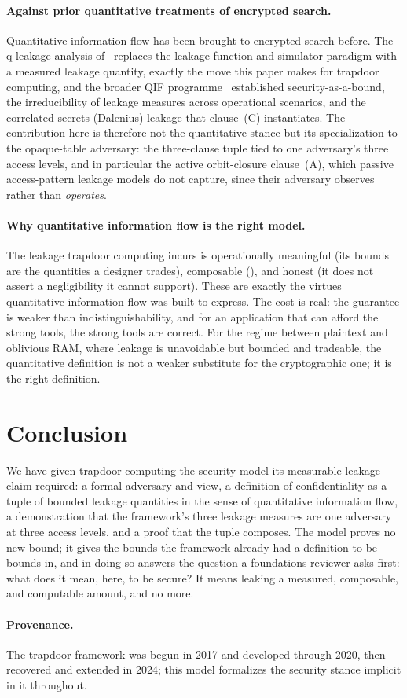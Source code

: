\documentclass[11pt]{article}
\theoremstyle{definition}
\theoremstyle{plain}
\theoremstyle{remark}
\begin{document}
\paragraph{Against prior quantitative treatments of encrypted search.}
Quantitative information flow has been brought to encrypted search before. The
q-leakage analysis of~\cite{falzon2024understanding} replaces the
leakage-function-and-simulator paradigm with a measured leakage quantity, exactly
the move this paper makes for trapdoor computing, and the broader QIF programme~%
\cite{smith2009foundations,alvim2020science,alvim2012gleakage} established
security-as-a-bound, the irreducibility of leakage measures across operational
scenarios, and the correlated-secrets (Dalenius) leakage that clause~(C)
instantiates. The contribution here is therefore not the quantitative stance but
its specialization to the opaque-table adversary: the three-clause tuple tied to
one adversary's three access levels, and in particular the active orbit-closure
clause~(A), which passive access-pattern leakage models do not capture, since
their adversary observes rather than \emph{operates}.

\paragraph{Why quantitative information flow is the right model.}
The leakage trapdoor computing incurs is operationally meaningful (its bounds
are the quantities a designer trades), composable (), and
honest (it does not assert a negligibility it cannot support). These are exactly
the virtues quantitative information flow was built to express. The cost is real:
the guarantee is weaker than indistinguishability, and for an application that
can afford the strong tools, the strong tools are correct. For the regime
between plaintext and oblivious RAM, where leakage is unavoidable but bounded
and tradeable, the quantitative definition is not a weaker substitute for the
cryptographic one; it is the right definition.

\section{Conclusion}

We have given trapdoor computing the security model its measurable-leakage claim
required: a formal adversary and view, a definition of confidentiality as a
tuple of bounded leakage quantities in the sense of quantitative information
flow, a demonstration that the framework's three leakage measures are one
adversary at three access levels, and a proof that the tuple composes. The model
proves no new bound; it gives the bounds the framework already had a definition
to be bounds in, and in doing so answers the question a foundations reviewer asks
first: what does it mean, here, to be secure? It means leaking a measured,
composable, and computable amount, and no more.

\paragraph{Provenance.} The trapdoor framework was begun in 2017 and developed
through 2020, then recovered and extended in 2024; this model formalizes the
security stance implicit in it throughout.



\end{document}
